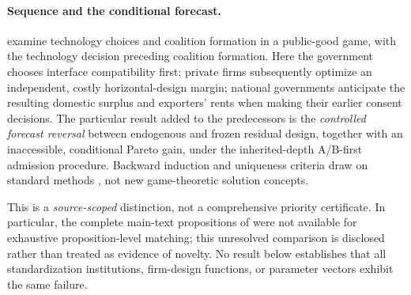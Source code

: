 \paragraph{Sequence and the conditional forecast.}
\citet{BuchholzHattori2024} examine technology choices
and coalition formation in a public-good game, with the
technology decision preceding coalition formation.
Here the government chooses interface compatibility
first; private firms subsequently optimize an independent,
costly horizontal-design margin; national governments anticipate the resulting domestic surplus
and exporters' rents when making their earlier consent decisions. The
particular result added to the predecessors is the
\emph{controlled forecast reversal} between endogenous
and frozen residual design, together with an inaccessible,
conditional Pareto gain, under the inherited-depth
A/B-first admission procedure.
Backward induction and uniqueness criteria draw on
standard methods \citep{RayVohra1999,Rosen1965}, not
new game-theoretic solution concepts.

This is a \emph{source-scoped} distinction, not a
comprehensive priority certificate. In particular,
the complete main-text propositions of
\citet{ChengHuang2025} were not available for exhaustive
proposition-level matching; this unresolved comparison
is disclosed rather than treated as evidence of novelty.
No result below establishes that all standardization
institutions, firm-design functions, or parameter vectors
exhibit the same failure.

